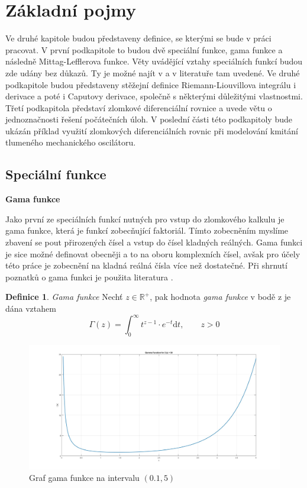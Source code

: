\documentclass[a4paper,12pt,twoside]{article}
\theoremstyle{definition}
\newtheorem{defin}[veta]{Definice}
\theoremstyle{remark}
\numberwithin{equation}{section}
\numberwithin{table}{section}
\numberwithin{figure}{section}
\newcommand{\dx}[1]{\mathrm{d} #1}
\newcommand{\R}{\mathbb{R}}
\begin{document}
\section{Základní pojmy}
Ve druhé kapitole budou představeny definice, se kterými se bude v práci pracovat. V první podkapitole to budou dvě speciální funkce, gama funkce a následně Mittag-Lefflerova funkce. Věty uvádějící vztahy speciálních funkcí budou zde udány bez důkazů. Ty je možné najít v \cite{Podlubny} a v literatuře tam uvedené.
Ve druhé podkapitole budou představeny stěžejní definice Riemann-Liouvillova integrálu i derivace a poté i Caputovy derivace, společně s některými důležitými vlastnostmi.
Třetí podkapitola představí zlomkové diferenciální rovnice a uvede větu o jednoznačnosti řešení počátečních úloh. V poslední části této podkapitoly bude ukázán příklad využití zlomkových diferenciálních rovnic při modelování kmitání tlumeného mechanického oscilátoru.
\subsection{Speciální funkce}
\textbf{Gama funkce}

\medskip
\noindent Jako první ze speciálních funkcí nutných pro vstup do zlomkového kalkulu je gama funkce, která je funkcí zobecňující faktoriál. Tímto zobecněním myslíme zbavení se pout přirozených čísel a vstup do čísel kladných reálných. Gama funkci je sice možné definovat obecněji a to na oboru komplexních čísel, avšak pro účely této práce je zobecnění na kladná reálná čísla více než dostatečné.
Při shrnutí poznatků o gama funkci je použita literatura \cite{Bashour}.
 
\begin{defin}{\emph{Gama funkce}} \label{GammaFunkce}
	Nechť $z \in \R ^{+}$, pak hodnota \emph{gama funkce} v bodě z je dána vztahem
	$$
	\Gamma \left( z\right)  = \int_{0}^{ \infty } t^{z-1} \cdot e^{-t} \dx{t}, \qquad   z > 0
	$$
\end{defin}


\begin{figure} [h!] 
	\caption{Graf gama funkce na  intervalu $\left(0.1, 5\right)$}
	\label{GrafGamma}
	\includegraphics[width=1\textwidth]{Gamma+.jpg}
\end{figure}
\end{document}
